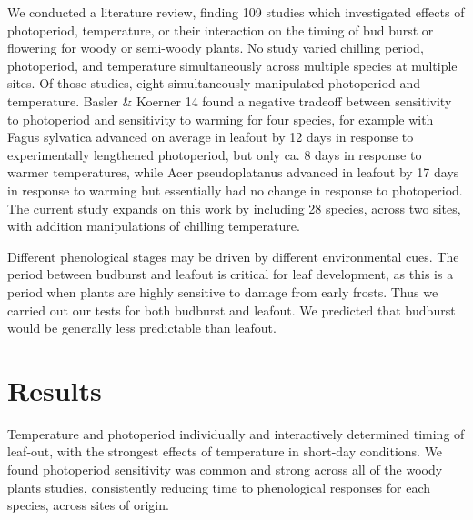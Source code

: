 \documentclass{article}
\begin{document}
We conducted a literature review, finding 109 studies which investigated effects of photoperiod, temperature, or their interaction on the timing of bud burst or flowering for woody or semi-woody plants.  No study varied chilling period, photoperiod, and temperature simultaneously across multiple species at multiple sites. Of those studies, eight simultaneously manipulated photoperiod and temperature. Basler \& Koerner 14 found a negative tradeoff between sensitivity to photoperiod and sensitivity to warming for four species, for example with Fagus sylvatica advanced on average in leafout by 12 days in response to experimentally lengthened photoperiod, but only ca. 8 days in response to warmer temperatures, while Acer pseudoplatanus advanced in leafout by 17 days in response to warming but essentially had no change in response to photoperiod. The current study expands on this work by including 28 species, across two sites, with addition manipulations of chilling temperature.

Different phenological stages may be driven by different environmental cues. The period between budburst and leafout is critical for leaf development, as this is a period when plants are highly sensitive to damage from early frosts. Thus we carried out our tests for both budburst and leafout. We predicted that budburst would be generally less predictable than leafout. %



\section*{Results}

Temperature and photoperiod individually and interactively determined timing of leaf-out, with the strongest effects of temperature in short-day conditions. We found photoperiod sensitivity was common and strong across all of the woody plants studies, consistently reducing time to phenological responses for each species, across sites of origin. 
\end{document}
